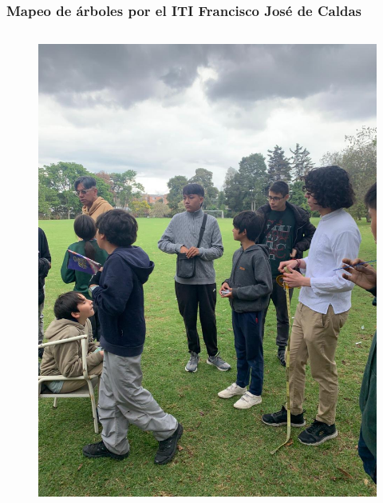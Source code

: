 \documentclass[17pt, t, lualatex]{beamer}
\begin{document}
\begin{frame}
  \frametitle{Mapeo de árboles por el ITI Francisco José de Caldas}
\begin{columns}
  \begin{column}{.5\textwidth}
  \begin{figure}
    \centering
    \includegraphics[height=0.8\textheight]{img/Mapeo1.jpg}
  \end{figure}
  \end{column}


\end{columns}
\end{frame}
\end{document}
